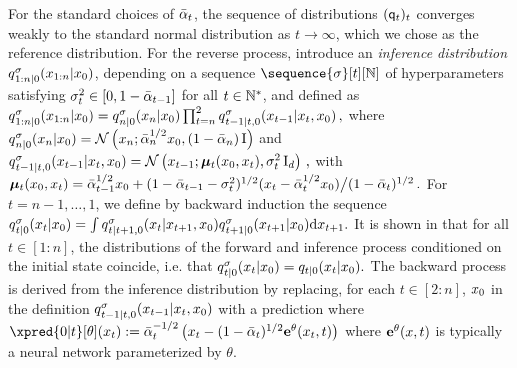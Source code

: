     For the standard choices of  $ \alphacumprod{t}{}$,  the sequence of distributions $(\fwmarg{t}{})_t$ converges weakly to the standard normal distribution as $t \to \infty$, which we chose as the reference distribution.   For the reverse process, \cite{song2021denoising,song2021maximum} introduce an \emph{inference distribution} $\revbridge{1:n|0}{\lstate_0}{{\chunk{\lstate}{1}{n}}}$, depending on a sequence $\sequence{\sigma}[t][\nset]$ of hyperparameters satisfying 
$\sigma_{t}^2 \in [0,1 - \alphacumprod{t-1}{}]$ for all $t \in \mathbb{N}^*$, and defined as
$\revbridge{1:n|0}{\lstate_0}{{\chunk{\lstate}{1}{n}}}=
\revbridge{n|0}{\lstate_0}{\lstate_n} \textstyle\prod_{t=n}^{2}
\revbridge{t-1|t, 0}{\lstate_t, \lstate_0}{\lstate_{t-1}} \eqsp,$ where $\revbridge{n|0}{\lstate_0}{\lstate_n}=\gauss\left(\lstate_n ; \alphacumprod{n}{}^{1/2} \lstate_0,\left(1-\alphacumprod{n}{}  \right) \Id \right)$ and
$\revbridge{t-1|t, 0}{\lstate_t,\lstate_0}{\lstate_{t-1}} =\gauss\left(\lstate_{t-1} ; \boldsymbol{\mu}_{t}(\lstate_0,\lstate_t), \sigma_{t}^2 \idm_{d} \right) \eqsp,$
with
$\boldsymbol{\mu}_{t}(\lstate_0,\lstate_t)= \alphacumprod{t-1}{} ^{1/2} \lstate_0+ (1- \alphacumprod{t-1}{} -\sigma^2 _t)^{1/2} (\lstate_t-\alphacumprod{t}{}^{1/2} \lstate_0) \big/ (1-\alphacumprod{t}{})^{1/2} \eqsp.$
For $t=n-1,\dots,1$, we define by backward induction the sequence $
\revbridge{t|0}{\lstate_0}{\lstate_t} %
=  \int \revbridge{t|t+1,0}{\lstate_{t+1}, \lstate_0}{\lstate_{t}} \revbridge{t+1|0}{\lstate_0}{\lstate_{t+1}} \rmd \lstate_{t+1}.$
It is shown in \cite[Lemma 1]{song2021denoising} that for all $t \in [1:n]$, the  distributions of the forward and inference process conditioned on the initial state coincide, i.e. that
$\revbridge{t|0}{\lstate_0}{\lstate_t} =  \fwtrans{t|0}{\lstate_0}{\lstate_t}.$
The backward process is derived from the inference distribution by replacing, for each $t \in [2:n]$, $x_0$ in the definition $\revbridge{t-1|t, 0}{\lstate_t, \lstate_0}{\lstate_{t-1}}$ with a prediction where $\xpred{0|t}[\theta](\lstate_t) \eqdef \alphacumprod{t}{}^{-1/2} \left(\lstate_t - (1 - \alphacumprod{t}{})^{1/2}\epsprop{\lstate_t, t}{\theta}\right)$
where $\epsprop{\lstate,t}{\theta}$ is typically a neural network parameterized by $\theta$.

